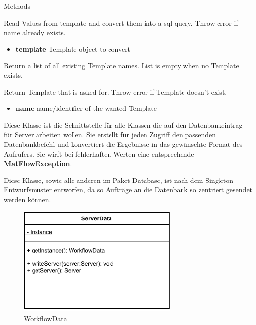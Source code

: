 \begin{methodenv}{Methods}
	
Read Values from template and convert them into a sql query.
Throw error if name already exists.

\begin{itemize}
	\item \textbf{template}
	Template object to convert
\end{itemize}

Return a list of all existing Template names.
List is empty when no Template exists.

Return Template that is asked for.
Throw error if Template doesn't exist.

\begin{itemize}
	\item \textbf{name}
	name/identifier of the wanted Template
\end{itemize}

\end{methodenv}

Diese Klasse ist die Schnittstelle für alle Klassen die auf den Datenbankeintrag für Server arbeiten wollen. Sie erstellt für jeden Zugriff den passenden Datenbankbefehl und konvertiert die Ergebnisse in das gewünschte Format des Aufrufers.
Sie wirft bei fehlerhaften Werten eine entsprechende \textbf{MatFlowException}.

Diese Klasse, sowie alle anderen im Paket Database, ist nach dem Singleton Entwurfsmuster entworfen, da so Aufträge an die Datenbank so zentriert gesendet werden können.
\begin{figure}[h]
	\centering
	\includegraphics[width=0.7\textwidth]{res/Klassen/ServerData.pdf} 
	\caption{WorkflowData}
	\label{fig:workflowDataClass}
\end{figure}

